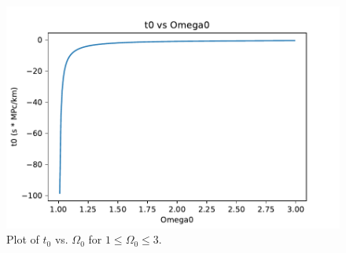 \begin{figure}[htbp]
    \centering
    \includegraphics[scale=0.7]{Images/Q5-3.pdf}
    \caption{Plot of $t_0$ vs. $\Omega_0$ for $1 \leq \Omega_0 \leq 3$.}
    \label{plot53}
\end{figure}

\newpage 
